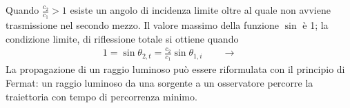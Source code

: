 \documentclass[letterpaper,10pt,italian]{jupyterBook}
\begin{document}
\sphinxAtStartPar
{} Quando \(\frac{c_2}{c_1} > 1\) esiste un angolo di incidenza limite oltre al quale non avviene trasmissione nel secondo mezzo. Il valore massimo della funzione \(\sin\) è 1; la condizione limite, di riflessione totale si ottiene quando
\begin{equation*}
\begin{split}1 = \sin \theta_{2,t} = \frac{c_2}{c_1} \sin \theta_{1,i} \qquad \rightarrow \qquad \end{split}
\end{equation*}
\sphinxAtStartPar
{} La propagazione di un raggio luminoso può essere riformulata con il principio di Fermat: un raggio luminoso da una sorgente a un osservatore percorre la traiettoria con tempo di percorrenza minimo.
\label{ch/waves/optics-geometric:example-0}
\end{document}
